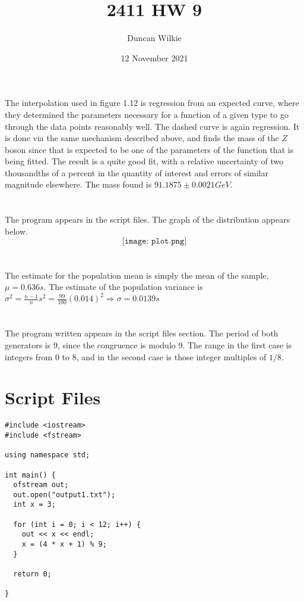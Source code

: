 \documentclass{article}
\title{2411 HW 9}
\author{Duncan Wilkie}
\date{12 November 2021}
\begin{document}
\maketitle

\section{}
The interpolation used in figure 1.12 is regression from an expected curve, where they determined the parameters necessary for a function of a given type to go through the data points reasonably well. The dashed curve is again regression. It is done via the same mechanism described above, and finds the mass of the $Z$ boson since that is expected to be one of the parameters of the function that is being fitted. The result is a quite good fit, with a relative uncertainty of two thousandths of a percent in the quantity of interest and errors of similar magnitude elsewhere. The mass found is $91.1875\pm { 0.0021}{GeV}$.

\section{}
The program appears in the script files.
The graph of the distribution appears below.
\[\texttt{[image: plot.png]}\]
\section{}
The estimate for the population mean is simply the mean of the sample, $\mu ={0.636}{s}$. The estimate of the population variance is $\sigma^2 = \frac{n-1}{n}s^2=\frac{99}{100}(0.014)^2\Rightarrow \sigma={0.0139}{s}$

\section{}
The program written appears in the script files section. The period of both generators is 9, since the congruence is modulo 9. The range in the first case is integers from 0 to 8, and in the second case is those integer multiples of $1/8$.

\section{Script Files}
\begin{verbatim}
#include <iostream>
#include <fstream>

using namespace std;

int main() {
  ofstream out;
  out.open("output1.txt");
  int x = 3;

  for (int i = 0; i < 12; i++) {
    out << x << endl;
    x = (4 * x + 1) % 9;
  }

  return 0;

}

\end{verbatim}
\end{document}
